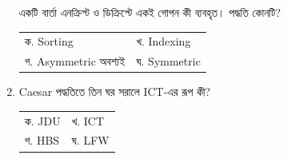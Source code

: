 \begin{multicols}{2}
\begin{enumerate}[resume]
\begin{minipage}[t]{\linewidth}
একটি বার্তা এনক্রিপ্ট ও ডিক্রিপ্টে একই গোপন কী ব্যবহৃত। পদ্ধতি কোনটি?
\par
\begin{tabularx}{\linewidth}{@{}X X@{}}
ক. Sorting & খ. Indexing \\
গ. Asymmetric অবশ্যই & ঘ. Symmetric \\
\end{tabularx}
\end{minipage}
\vspace{1pt}
\item \begin{minipage}[t]{\linewidth}
Caesar পদ্ধতিতে তিন ঘর সরালে ICT-এর রূপ কী?
\par
\begin{tabularx}{\linewidth}{@{}X X@{}}
ক. JDU & খ. ICT \\
গ. HBS & ঘ. LFW \\
\end{tabularx}
\end{minipage}
\vspace{1pt}


\end{enumerate}
\end{multicols}
